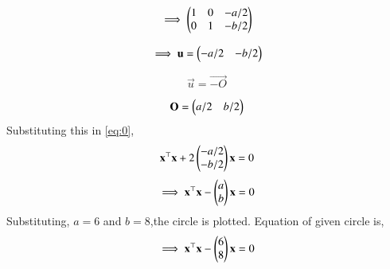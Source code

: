 \documentclass[journal,12pt,twocolumn]{IEEEtran}
\begin{document}
\begin{equation}
  \implies \begin{pmatrix}1 & 0 & -a/2 \\ 0& 1 & -b/2\end{pmatrix}
\end{equation}


\begin{equation}
    \implies \mathbf{u}=\begin{pmatrix}-a/2 & -b/2\end{pmatrix} 
\end{equation}

\begin{equation}
    \vec{u} = \vec{-O}
\end{equation}

\begin{equation}
    \mathbf{O} = \begin{pmatrix}a/2 & b/2\end{pmatrix}
\end{equation}
Substituting this in \eqref{eq:0},
\begin{equation}
    \mathbf{x^\top}\mathbf{x}+2\begin{pmatrix}-a/2 \\ -b/2\end{pmatrix}\mathbf{x}=0 
\end{equation}
\begin{equation}
   \implies \mathbf{x^\top}\mathbf{x}-\begin{pmatrix}a \\ b \end{pmatrix}\mathbf{x}=0
\end{equation}
Substituting, $a=6$ and $b=8$,the circle is plotted.
Equation of given circle is,
\begin{equation}
   \implies \mathbf{x^\top}\mathbf{x}-\begin{pmatrix}6 \\ 8 \end{pmatrix}\mathbf{x}=0
\end{equation}
\end{document}
